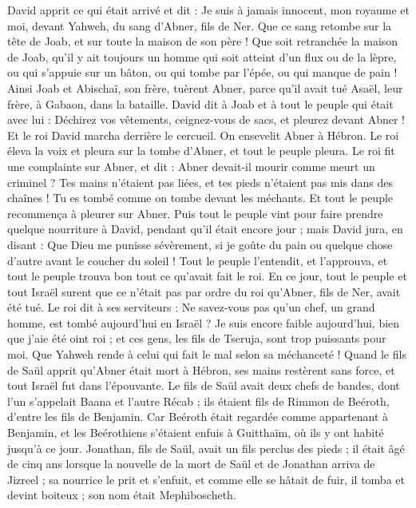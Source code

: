 \begin{multicols}{2}
David apprit ce qui était arrivé et dit : Je suis à jamais innocent, mon royaume et moi, devant Yahweh, du sang d'Abner, fils de Ner.
Que ce sang retombe sur la tête de Joab, et sur toute la maison de son père ! Que soit retranchée la maison de Joab, qu'il y ait toujours un homme qui soit atteint d’un flux ou de la lèpre, ou qui s'appuie sur un bâton, ou qui tombe par l'épée, ou qui manque de pain !
Ainsi Joab et Abischaï, son frère, tuèrent Abner, parce qu'il avait tué Asaël, leur frère, à Gabaon, dans la bataille.
David dit à Joab et à tout le peuple qui était avec lui : Déchirez vos vêtements, ceignez-vous de sacs, et pleurez devant Abner ! Et le roi David marcha derrière le cercueil.
On ensevelit Abner à Hébron. Le roi éleva la voix et pleura sur la tombe d'Abner, et tout le peuple pleura.
Le roi fit une complainte sur Abner, et dit : Abner devait-il mourir comme meurt un criminel ?
Tes mains n'étaient pas liées, et tes pieds n'étaient pas mis dans des chaînes ! Tu es tombé comme on tombe devant les méchants. Et tout le peuple recommença à pleurer sur Abner.
Puis tout le peuple vint pour faire prendre quelque nourriture à David, pendant qu'il était encore jour ; mais David jura, en disant : Que Dieu me punisse sévèrement, si je goûte du pain ou quelque chose d’autre avant le coucher du soleil !
Tout le peuple l'entendit, et l’approuva, et tout le peuple trouva bon tout ce qu’avait fait le roi.
En ce jour, tout le peuple et tout Israël surent que ce n’était pas par ordre du roi qu'Abner, fils de Ner, avait été tué.
Le roi dit à ses serviteurs : Ne savez-vous pas qu'un chef, un grand homme, est tombé aujourd'hui en Israël ?
Je suis encore faible aujourd'hui, bien que j'aie été oint roi ; et ces gens, les fils de Tseruja, sont trop puissants pour moi. Que Yahweh rende à celui qui fait le mal selon sa méchanceté !
\VerseOne{}Quand le fils de Saül apprit qu'Abner était mort à Hébron, ses mains restèrent sans force, et tout Israël fut dans l’épouvante.
Le fils de Saül avait deux chefs de bandes, dont l'un s’appelait Baana et l'autre Récab ; ils étaient fils de Rimmon de Beéroth, d’entre les fils de Benjamin. Car Beéroth était regardée comme appartenant à Benjamin,
et les Beérothiens s'étaient enfuis à Guitthaïm, où ils y ont habité jusqu'à ce jour.
Jonathan, fils de Saül, avait un fils perclus des pieds ; il était âgé de cinq ans lorsque la nouvelle de la mort de Saül et de Jonathan arriva de Jizreel ; sa nourrice le prit et s'enfuit, et comme elle se hâtait de fuir, il tomba et devint boiteux ; son nom était Mephiboscheth.

\end{multicols}

